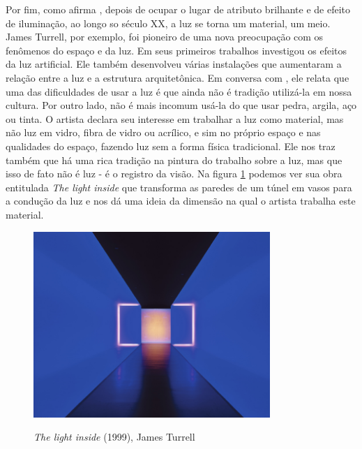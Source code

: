 Por fim, como afirma , depois de ocupar o lugar de atributo brilhante e de efeito de iluminação, ao longo so século XX, a luz se torna um material, um meio. James Turrell, por exemplo, foi pioneiro de uma nova preocupação com os fenômenos do espaço e da luz. Em seus primeiros trabalhos investigou os efeitos da luz artificial. Ele também desenvolveu várias instalações que aumentaram a relação entre a luz e a estrutura arquitetônica. Em conversa com , ele relata que uma das dificuldades de usar a luz é que ainda não é tradição utilizá-la em nossa cultura. Por outro lado, não é mais incomum usá-la do que usar pedra, argila, aço ou tinta. O artista declara seu interesse em trabalhar a luz como material, mas não luz em vidro, fibra de vidro ou acrílico, e sim no próprio espaço e nas qualidades do espaço, fazendo luz sem a forma física tradicional. Ele nos traz também que há uma rica tradição na pintura do trabalho sobre a luz, mas que isso de fato não é luz - é o registro da visão. Na figura \ref{fig:james_turrell} podemos ver sua obra entitulada \textit{The light inside} que transforma as paredes de um túnel em vasos para a condução da luz e nos dá uma ideia da dimensão na qual o artista trabalha este material. 

\begin{figure}[H]
    \centering
    \caption{\textit{The light inside} (1999), James Turrell}
	\vspace*{0,2cm}
    \includegraphics[width=0.8\textwidth]{./04-figuras/james_turrell}
    \label{fig:james_turrell}
\end{figure}
\vspace*{-0,9cm}
{\raggedright {}}\\


